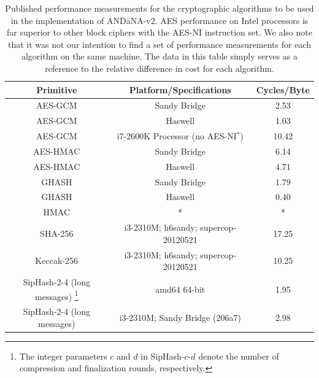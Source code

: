 \documentclass[10pt]{article}
\begin{document}
\begin{table}
\centering
\caption{Published performance measurements for the cryptographic algorithms to be used in the implementation of {\sf AND\=aNA-v2}. AES performance on Intel processors is far superior to other block ciphers with the AES-NI instruction set. We also note that it was not our intention to find a set of performance measurements for each algorithm on the same machine. The data in this table simply serves as a reference to the relative difference in cost for each algorithm.}
\label{tab:baseline}
  \begin{tabular}{| c | c | c |} \hline
  Primitive & Platform/Specifications & Cycles/Byte \\ \hline
  AES-GCM \cite{aesgcm-intel}         & Sandy Bridge & 2.53 \\
  AES-GCM \cite{aesgcm-intel}         & Haswell & 1.03 \\
  AES-GCM \cite{aesgcm-intel}         & i7-2600K Processor (no AES-NI$^*$) & 10.42 \\
  AES-HMAC \cite{aesgcm-intel}        & Sandy Bridge & 6.14 \\
  AES-HMAC \cite{aesgcm-intel}        & Haswell & 4.71  \\
  GHASH \cite{aesgcm-intel}           & Sandy Bridge & 1.79  \\
  GHASH \cite{aesgcm-intel}           & Haswell & 0.40  \\
  HMAC                                & * & *  \\
  SHA-256 \cite{nist-sha3}            & i3-2310M; h6sandy; supercop-20120521  & 17.25 \\
  Keccak-256 \cite{nist-sha3}         & i3-2310M; h6sandy; supercop-20120521  & 10.25  \\
  SipHash-2-4 (long messages) \footnote{The integer parameters $c$ and $d$ in SipHash-$c$-$d$ denote the number of compression and finalization rounds, respectively.} \cite{siphash} & amd64 64-bit & 1.95 \\ 
  SipHash-2-4 (long messages) \cite{siphash}      & i3-2310M; Sandy Bridge (206a7)  & 2.98 \\ \hline
  \end{tabular}
\end{table}
\end{document}
